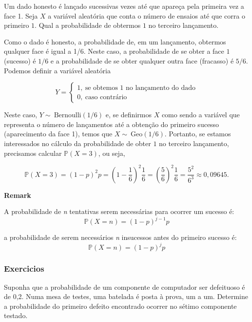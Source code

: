 \documentclass[10pt,a4paper]{article}
\begin{document}
\begin{eg}
	Um dado honesto é lançado sucessivas vezes até que apareça pela primeira vez a face 1. Seja $ X $ a variável aleatória que conta o número de ensaios até que corra o primeiro $ 1 $. Qual a probabilidade de obtermos $ 1 $ no terceiro lançamento.
\end{eg}
\begin{sol}
Como o dado é honesto, a probabilidade de, em um lançamento, obtermos qualquer face é igual a 1/6. Neste caso, a probabilidade de se obter a face $ 1 $ (sucesso) é $ 1/6 $ e a probabilidade de se obter qualquer outra face (fracasso) é $ 5/6 $. Podemos definir a variável aleatória


\[Y = \left\{\begin{array}{l}1, \ \text{se obtemos 1 no lançamento do dado}\\0, \ \text{caso contrário}\end{array}\right.\] 	

 

Neste caso, $ Y\sim \ \text{Bernoulli}(1/6) $ e, se definirmos $ X $ como sendo a variável que representa o número de lançamentos até a obtenção do primeiro sucesso (aparecimento da face 1), temos que $ X \sim \ \text{Geo}(1/6) $. Portanto, se estamos interessados no cálculo da probabilidade de obter $ 1 $ no terceiro lançamento, precisamos calcular $ \mathbb{P}(X = 3) $, ou seja,


\[\mathbb{P}(X=3)=(1-p)^2p=\left(1-\frac{1}{6}\right)^2\frac{1}{6}=\left(\frac{5}{6}\right)^2\frac{1}{6}=\frac{5^2}{6^3}\approx 0,09645.\]
\end{sol}
\begin{mdframed}[linewidth=0.6pt]
\textbf{Remark}

	A probabilidade de \textit{n} tentativas serem necessárias para ocorrer um sucesso é:
	\[\mathbb{P}(X=n) = (1-p)^{j-1}p\]

	a probabilidade de serem necessários \textit{n} insucessos antes do primeiro sucesso é:
	\[\mathbb{P}(X=n) = (1-p)^{j}p\]

\end{mdframed}

\subsubsection{Exercicios}

\begin{ex}
	Suponha que a probabilidade de um componente de computador ser defeituoso é de 0,2.  Numa mesa de testes, uma batelada é posta à prova, um a um.  Determine a probabilidade do primeiro defeito encontrado ocorrer no sétimo componente testado.
\end{ex}
\end{document}
